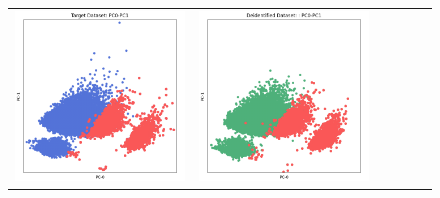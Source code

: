 \begin{figure}[p!]
\begin{tabular}{@{} M{0.166\textwidth} M{0.166\textwidth} | M{0.166\textwidth} M{0.166\textwidth} | M{0.166\textwidth} M{0.166\textwidth} @{}}
       \includegraphics[width=\linewidth]{z_MostlyAI.orig.png} &
       \includegraphics[width=\linewidth]{z_MostlyAI.syn.png} \\ 

\end{tabular}
\end{figure}

